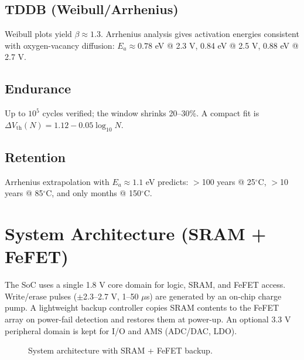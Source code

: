 \documentclass[conference]{IEEEtran}
\newcommand{\tightsecspace}{\vspace{0.3\baselineskip}}
\begin{document}
\subsection{TDDB (Weibull/Arrhenius)}
Weibull plots yield $\beta \approx 1.3$. 
Arrhenius analysis gives activation energies consistent with oxygen-vacancy diffusion: 
$E_a \approx 0.78$ eV @ 2.3 V, 0.84 eV @ 2.5 V, 0.88 eV @ 2.7 V.

\subsection{Endurance}
Up to $10^5$ cycles verified; the window shrinks 20–30\%. 
A compact fit is $\Delta V_{\mathrm{th}}(N) = 1.12 - 0.05 \log_{10} N$.

\subsection{Retention}
Arrhenius extrapolation with $E_a \approx 1.1$ eV predicts: 
$>$100 years @ 25$^\circ$C, $>$10 years @ 85$^\circ$C, and only months @ 150$^\circ$C.

\tightsecspace
\section{System Architecture (SRAM + FeFET)}
The SoC uses a single 1.8 V core domain for logic, SRAM, and FeFET access.
Write/erase pulses ($\pm$2.3–2.7 V, 1–50 $\mu$s) are generated by an on-chip charge pump.
A lightweight backup controller copies SRAM contents to the FeFET array on power-fail detection and restores them at power-up.
An optional 3.3 V peripheral domain is kept for I/O and AMS (ADC/DAC, LDO).

\begin{figure}[!t]
  \centering
  \caption{System architecture with SRAM + FeFET backup.}
  \label{fig:system}
\end{figure}
\end{document}
